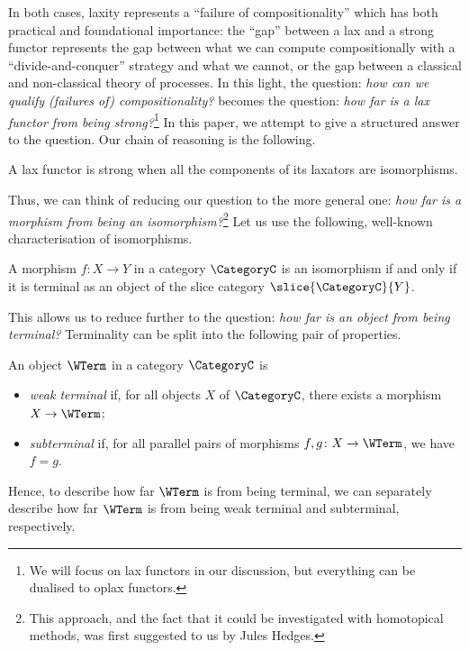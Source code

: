 In both cases, laxity represents a ``failure of compositionality'' which has both practical and foundational importance: the ``gap'' between a lax and a strong functor represents the gap between what we can compute compositionally with a ``divide-and-conquer'' strategy and what we cannot, or the gap between a classical and non-classical theory of processes.
In this light, the question: \emph{how can we qualify (failures of) compositionality?} becomes the question: \emph{how far is a lax functor from being strong?}\footnote{We will focus on lax functors in our discussion, but everything can be dualised to oplax functors.}
In this paper, we attempt to give a structured answer to the question.
Our chain of reasoning is the following.
%
%
\begin{definition}
    A lax functor is strong when all the components of its laxators are isomorphisms.
\end{definition}
%
Thus, we can think of reducing our question to the more general one: \emph{how far is a morphism from being an isomorphism?}\footnote{This approach, and the fact that it could be investigated with homotopical methods, was first suggested to us by Jules Hedges.}
Let us use the following, well-known characterisation of isomorphisms.
%
%
\begin{proposition}\label{prop: iso if terminal in slice}
    A morphism $f\colon X \to Y$ in a category $\CategoryC$ is an isomorphism if and only if it is terminal as an object of the slice category $\slice{\CategoryC}{Y}$.
\end{proposition}
%
This allows us to reduce further to the question: \emph{how far is an object from being terminal?}
Terminality can be split into the following pair of properties.
%
%
\begin{definition}\label{def: weak and subterminal}
    An object $\WTerm$ in a category $\CategoryC$ is
    \begin{itemize}
        \item \emph{weak terminal} if, for all objects $X$ of $\CategoryC$, there exists a morphism $X \to \WTerm$;
        \item \emph{subterminal} if, for all parallel pairs of morphisms $f, g\colon X \to \WTerm$, we have $f = g$.
    \end{itemize}
\end{definition}
%
Hence, to describe how far $\WTerm$ is from being terminal, we can separately describe how far $\WTerm$ is from being weak terminal and subterminal, respectively.

